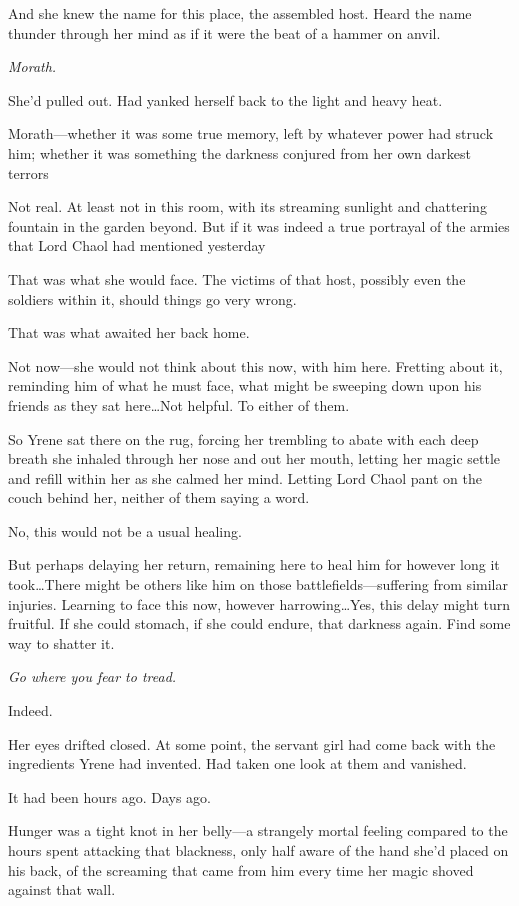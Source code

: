 And she knew the name for this place, the assembled host.
Heard the name thunder through her mind as if it were the beat of a hammer on anvil.

\emph{Morath.}

She'd pulled out.
Had yanked herself back to the light and heavy heat.

Morath---whether it was some true memory, left by whatever power had struck him; whether it was something the darkness conjured from her own darkest terrors 

Not real.
At least not in this room, with its streaming sunlight and chattering fountain in the garden beyond.
But if it was indeed a true portrayal of the armies that Lord Chaol had mentioned yesterday 

That was what she would face.
The victims of that host, possibly even the soldiers within it, should things go very wrong.

That was what awaited her back home.

Not now---she would not think about this now, with him here.
Fretting about it, reminding him of what he must face, what might be sweeping down upon his friends as they sat here\ldots Not helpful.
To either of them.

So Yrene sat there on the rug, forcing her trembling to abate with each deep breath she inhaled through her nose and out her mouth, letting her magic settle and refill within her as she calmed her mind.
Letting Lord Chaol pant on the couch behind her, neither of them saying a word.

No, this would not be a usual healing.

But perhaps delaying her return, remaining here to heal him for however long it took\ldots There might be others like him on those battlefields---suffering from similar injuries.
Learning to face this now, however harrowing\ldots Yes, this delay might turn fruitful.
If she could stomach, if she could endure, that darkness again.
Find some way to shatter it.

\emph{Go where you fear to tread.}

Indeed.

Her eyes drifted closed.
At some point, the servant girl had come back with the ingredients Yrene had invented.
Had taken one look at them and vanished.

It had been hours ago.
Days ago.

Hunger was a tight knot in her belly---a strangely mortal feeling compared to the hours spent attacking that blackness, only half aware of the hand she'd placed on his back, of the screaming that came from him every time her magic shoved against that wall.

